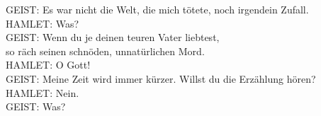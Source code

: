 {\begin{playdialog}
GEIST: Es war nicht die Welt, die mich tötete, noch irgendein Zufall.\\

HAMLET: Was?\\

GEIST: Wenn du je deinen teuren Vater liebtest,\\
so räch seinen schnöden, unnatürlichen Mord.\\

HAMLET: O Gott!\\

GEIST: Meine Zeit wird immer kürzer. Willst du die Erzählung hören?\\

HAMLET: Nein.\\

GEIST: Was?\\


\end{playdialog}}
